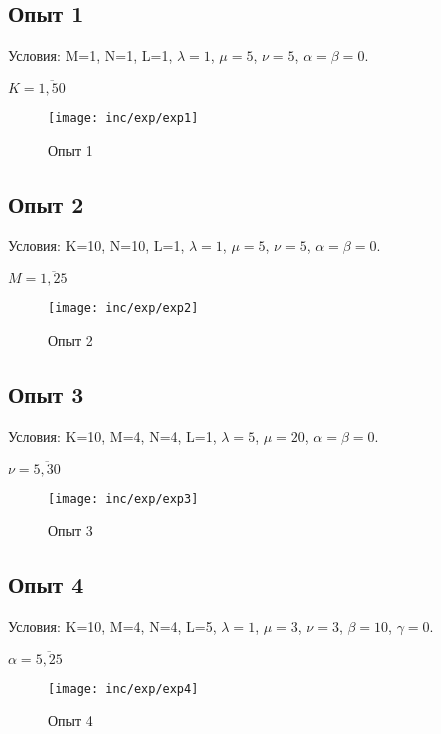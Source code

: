 \documentclass[utf8x, 12pt]{G7-32} %
\begin{document}
\subsection{Опыт 1}

Условия:
M=1, N=1, L=1, $\lambda = 1$, $\mu=5$, $\nu=5$, $\alpha=\beta=0$. 

$K=\overline{1,50}$

\begin{figure}[ht]
\centering
\texttt{[image: inc/exp/exp1]}
\caption{Опыт 1}
\label{fig:exp1}
\end{figure}


\subsection{Опыт 2}

Условия:
K=10, N=10, L=1, $\lambda = 1$, $\mu=5$, $\nu=5$, $\alpha=\beta=0$. 

$M=\overline{1,25}$

\begin{figure}[ht]
\centering
\texttt{[image: inc/exp/exp2]}
\caption{Опыт 2}
\label{fig:exp2}
\end{figure}

\subsection{Опыт 3}

Условия:
K=10, M=4, N=4, L=1, $\lambda = 5$, $\mu=20$, $\alpha=\beta=0$. 

$\nu=\overline{5,30}$

\begin{figure}[ht]
\centering
\texttt{[image: inc/exp/exp3]}
\caption{Опыт 3}
\label{fig:exp3}
\end{figure}

\subsection{Опыт 4}

Условия:
K=10, M=4, N=4, L=5, $\lambda = 1$, $\mu=3$, $\nu=3$, $\beta=10$, $\gamma=0$. 

$\alpha=\overline{5,25}$

\begin{figure}[ht]
\centering
\texttt{[image: inc/exp/exp4]}
\caption{Опыт 4}
\label{fig:exp4}
\end{figure}


\mainmatter %


\backmatter %



\appendix   %
\end{document}
